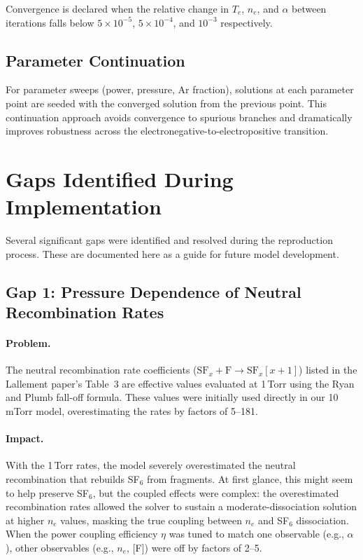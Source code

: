 \documentclass[11pt,a4paper]{article}
\newcommand{\SFx}{\mathrm{SF}_x}
\newcommand{\Te}{T_e}
\newcommand{\ne}{n_e}
\begin{document}
Convergence is declared when the relative change in $\Te$, $\ne$, and $\alpha$ between iterations falls below $5 \times 10^{-5}$, $5 \times 10^{-4}$, and $10^{-3}$ respectively.

\subsection{Parameter Continuation}

For parameter sweeps (power, pressure, Ar fraction), solutions at each parameter point are seeded with the converged solution from the previous point.  This continuation approach avoids convergence to spurious branches and dramatically improves robustness across the electronegative-to-electropositive transition.

\section{Gaps Identified During Implementation}
\label{sec:gaps}

Several significant gaps were identified and resolved during the reproduction process.  These are documented here as a guide for future model development.

\subsection{Gap 1: Pressure Dependence of Neutral Recombination Rates}

\paragraph{Problem.} The neutral recombination rate coefficients ($\SFx + \mathrm{F} \to \SFx[x+1]$) listed in the Lallement paper's Table~3 are effective values evaluated at 1\,Torr using the Ryan and Plumb fall-off formula.  These values were initially used directly in our 10\,mTorr model, overestimating the rates by factors of 5--181.

\paragraph{Impact.} With the 1\,Torr rates, the model severely overestimated the neutral recombination that rebuilds SF$_6$ from fragments.  At first glance, this might seem to help preserve SF$_6$, but the coupled effects were complex: the overestimated recombination rates allowed the solver to sustain a moderate-dissociation solution at higher $\ne$ values, masking the true coupling between $\ne$ and SF$_6$ dissociation.  When the power coupling efficiency $\eta$ was tuned to match one observable (e.g., $\alpha$), other observables (e.g., $\ne$, [F]) were off by factors of 2--5.
\end{document}
